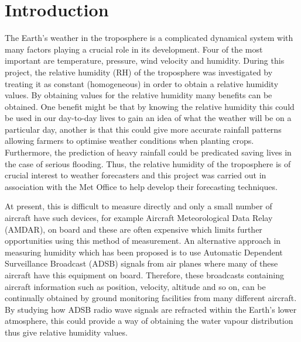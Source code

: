 \documentclass{article}
\begin{document}
\newpage

\tableofcontents


\setcounter{page}{1} %

\newpage


\section{Introduction}
\label{sec:introduction}

The Earth's weather in the troposphere is a complicated dynamical system with many factors playing a crucial role in its development. Four of the most important are temperature, pressure, wind velocity and humidity. During this project, the relative humidity (RH) of the troposphere was investigated by treating it as constant (homogeneous) in order to obtain a relative humidity values. By obtaining values for the relative humidity many benefits can be obtained. One benefit might be that by knowing the relative humidity this could be used in our day-to-day lives to gain an idea of what the weather will be on a particular day, another is that this could give more accurate rainfall patterns allowing farmers to optimise weather conditions when planting crops. Furthermore, the prediction of heavy rainfall could be predicated {\textemdash} saving lives in the case of serious flooding. Thus, the relative humidity of the troposphere is of crucial interest to weather forecasters and this project was carried out in association with the Met Office to help develop their forecasting techniques.

\vspace{2mm}
\noindent
At present, this is difficult to measure directly and only a small number of aircraft have such devices, for example Aircraft Meteorological Data Relay (AMDAR), on board \cite{Paper01} and these are often expensive which limits further opportunities using this method of measurement. An alternative approach in measuring humidity which has been proposed \cite{Paper01} is to use Automatic Dependent Surveillance Broadcast (ADSB) signals from air planes where many of these aircraft have this equipment on board. Therefore, these broadcasts containing aircraft information such as position, velocity, altitude and so on, can be continually obtained by ground monitoring facilities from many different aircraft. By studying how ADSB radio wave signals are refracted within the Earth's lower atmosphere, this could provide a way of obtaining the water vapour distribution thus give relative humidity values.
\end{document}
